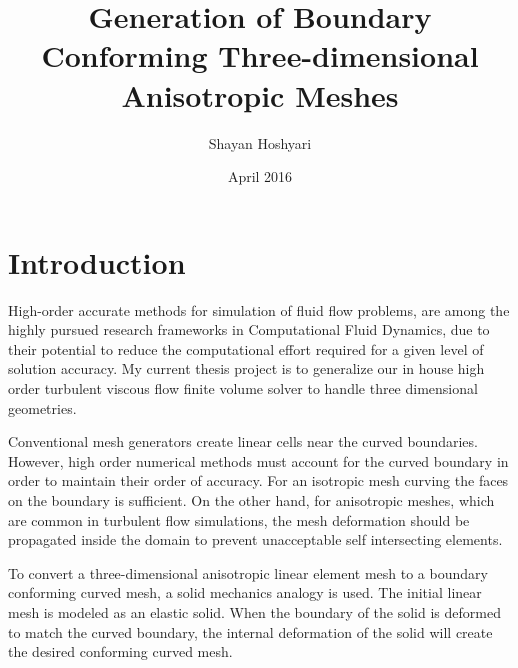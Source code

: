 \documentclass[letter,12pt]{article}
\title{Generation of Boundary Conforming Three-dimensional Anisotropic Meshes}
\date{April 2016}
\author{Shayan Hoshyari}
\begin{document}
\maketitle
\tableofcontents
{}


\section{Introduction}

High-order accurate methods for simulation of fluid flow problems, are
among the highly pursued research frameworks in Computational Fluid
Dynamics, due to their potential to reduce the computational effort
required for a given level of solution accuracy. My
current thesis project is to generalize our in house high order
turbulent viscous flow finite volume solver\cite{jalali} to handle
three dimensional geometries.

Conventional mesh generators create linear cells near the curved
boundaries. However, high order numerical methods must account for the
curved boundary in order to maintain their order of accuracy. For an
isotropic mesh curving the faces on the boundary is sufficient. On the
other hand, for anisotropic meshes, which are common in turbulent flow
simulations, the mesh deformation should be propagated inside the
domain to prevent unacceptable self intersecting elements.

To convert a three-dimensional anisotropic linear element mesh to a
boundary conforming curved mesh, a solid mechanics analogy is
used. The initial linear mesh is modeled as an elastic solid. When the
boundary of the solid is deformed to match the curved boundary, the
internal deformation of the solid will create the desired conforming
curved mesh.
\end{document}
